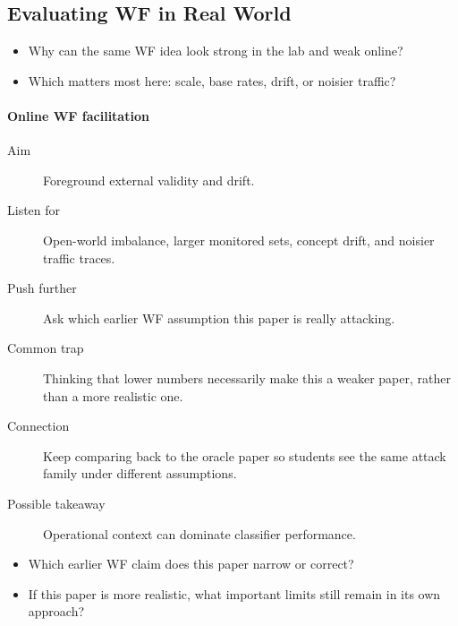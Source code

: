 \subsection{Evaluating WF in Real World}

\begin{frame}
  \begin{question}
    \begin{itemize}
      \item Why can the same WF idea look strong in the lab and weak online?
      \item Which matters most here: scale, base rates, drift, or noisier
        traffic?
    \end{itemize}
  \end{question}
\end{frame}

\paragraph{Online WF facilitation}
\begin{description}
  \item[Aim] Foreground external validity and drift.
  \item[Listen for] Open-world imbalance, larger monitored sets, concept drift,
    and noisier traffic traces.
  \item[Push further] Ask which earlier WF assumption this paper is really
    attacking.
  \item[Common trap] Thinking that lower numbers necessarily make this a weaker
    paper, rather than a more realistic one.
  \item[Connection] Keep comparing back to the oracle paper so students see the
    same attack family under different assumptions.
  \item[Possible takeaway] Operational context can dominate classifier
    performance.
\end{description}

\begin{frame}
  \begin{question}
    \begin{itemize}
      \item Which earlier WF claim does this paper narrow or correct?
      \item If this paper is more realistic, what important limits still remain
        in its own approach?
    \end{itemize}
  \end{question}
\end{frame}

